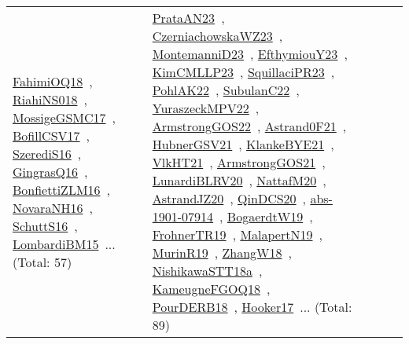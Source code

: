 {\begin{longtable}{lp{3cm}>{\raggedright\arraybackslash}p{6cm}>{\raggedright\arraybackslash}p{6cm}>{\raggedright\arraybackslash}p{8cm}}
\href{articles/FahimiOQ18.pdf}{FahimiOQ18}~\cite{FahimiOQ18}, \href{papers/RiahiNS018.pdf}{RiahiNS018}~\cite{RiahiNS018}, \href{papers/MossigeGSMC17.pdf}{MossigeGSMC17}~\cite{MossigeGSMC17}, \href{papers/BofillCSV17.pdf}{BofillCSV17}~\cite{BofillCSV17}, \href{papers/SzerediS16.pdf}{SzerediS16}~\cite{SzerediS16}, \href{papers/GingrasQ16.pdf}{GingrasQ16}~\cite{GingrasQ16}, \href{papers/BonfiettiZLM16.pdf}{BonfiettiZLM16}~\cite{BonfiettiZLM16}, \href{articles/NovaraNH16.pdf}{NovaraNH16}~\cite{NovaraNH16}, \href{papers/SchuttS16.pdf}{SchuttS16}~\cite{SchuttS16}, \href{papers/LombardiBM15.pdf}{LombardiBM15}~\cite{LombardiBM15}... (Total: 57) & \href{articles/PrataAN23.pdf}{PrataAN23}~\cite{PrataAN23}, \href{articles/CzerniachowskaWZ23.pdf}{CzerniachowskaWZ23}~\cite{CzerniachowskaWZ23}, \href{articles/MontemanniD23.pdf}{MontemanniD23}~\cite{MontemanniD23}, \href{papers/EfthymiouY23.pdf}{EfthymiouY23}~\cite{EfthymiouY23}, \href{papers/KimCMLLP23.pdf}{KimCMLLP23}~\cite{KimCMLLP23}, \href{papers/SquillaciPR23.pdf}{SquillaciPR23}~\cite{SquillaciPR23}, \href{articles/PohlAK22.pdf}{PohlAK22}~\cite{PohlAK22}, \href{articles/SubulanC22.pdf}{SubulanC22}~\cite{SubulanC22}, \href{articles/YuraszeckMPV22.pdf}{YuraszeckMPV22}~\cite{YuraszeckMPV22}, \href{papers/ArmstrongGOS22.pdf}{ArmstrongGOS22}~\cite{ArmstrongGOS22}, \href{papers/Astrand0F21.pdf}{Astrand0F21}~\cite{Astrand0F21}, \href{articles/HubnerGSV21.pdf}{HubnerGSV21}~\cite{HubnerGSV21}, \href{papers/KlankeBYE21.pdf}{KlankeBYE21}~\cite{KlankeBYE21}, \href{articles/VlkHT21.pdf}{VlkHT21}~\cite{VlkHT21}, \href{papers/ArmstrongGOS21.pdf}{ArmstrongGOS21}~\cite{ArmstrongGOS21}, \href{articles/LunardiBLRV20.pdf}{LunardiBLRV20}~\cite{LunardiBLRV20}, \href{papers/NattafM20.pdf}{NattafM20}~\cite{NattafM20}, \href{articles/AstrandJZ20.pdf}{AstrandJZ20}~\cite{AstrandJZ20}, \href{articles/QinDCS20.pdf}{QinDCS20}~\cite{QinDCS20}, \href{articles/abs-1901-07914.pdf}{abs-1901-07914}~\cite{abs-1901-07914}, \href{papers/BogaerdtW19.pdf}{BogaerdtW19}~\cite{BogaerdtW19}, \href{papers/FrohnerTR19.pdf}{FrohnerTR19}~\cite{FrohnerTR19}, \href{papers/MalapertN19.pdf}{MalapertN19}~\cite{MalapertN19}, \href{papers/MurinR19.pdf}{MurinR19}~\cite{MurinR19}, \href{articles/ZhangW18.pdf}{ZhangW18}~\cite{ZhangW18}, \href{papers/NishikawaSTT18a.pdf}{NishikawaSTT18a}~\cite{NishikawaSTT18a}, \href{papers/KameugneFGOQ18.pdf}{KameugneFGOQ18}~\cite{KameugneFGOQ18}, \href{articles/PourDERB18.pdf}{PourDERB18}~\cite{PourDERB18}, \href{papers/Hooker17.pdf}{Hooker17}~\cite{Hooker17}... (Total: 89)\\

\end{longtable}}
